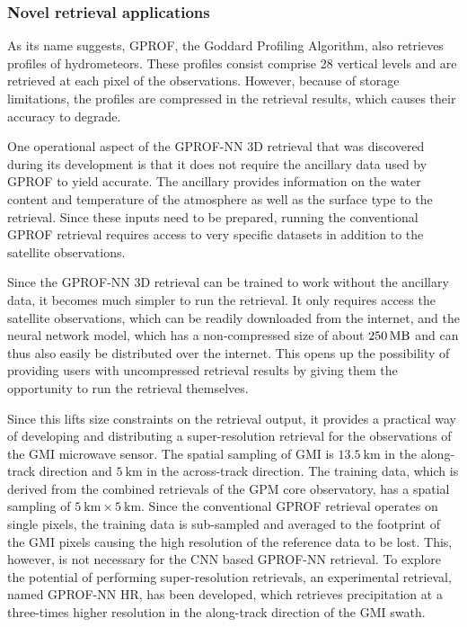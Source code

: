 \subsubsection{Novel retrieval applications}

As its name suggests, GPROF, the Goddard Profiling Algorithm, also retrieves
profiles of hydrometeors. These profiles consist comprise 28 vertical levels and
are retrieved at each pixel of the observations. However, because of storage
limitations, the profiles are compressed in the retrieval results, which causes
their accuracy to degrade.

One operational aspect of the GPROF-NN 3D retrieval that was discovered during
its development is that it does not require the ancillary data used by GPROF to
yield accurate. The ancillary provides information on the water content and
temperature of the atmosphere as well as the surface type to the retrieval.
Since these inputs need to be prepared, running the conventional GPROF retrieval
requires access to very specific datasets in addition to the satellite
observations.


Since the GPROF-NN 3D retrieval can be trained to work without the ancillary
data, it becomes much simpler to run the retrieval. It only requires access the
satellite observations, which can be readily downloaded from the internet, and
the neural network model, which has a non-compressed size of about
$\SI{250}{\mega \byte}$ and can thus also easily be distributed over the
internet. This opens up the possibility of providing users with uncompressed
retrieval results by giving them the opportunity to run the retrieval
themselves.

Since this lifts size constraints on the retrieval output, it provides a
practical way of developing and distributing a super-resolution retrieval for
the observations of the GMI microwave sensor. The spatial sampling of GMI is
$\SI{13.5}{\kilo \meter}$ in the along-track direction and $\SI{5}{\kilo
  \meter}$ in the across-track direction. The training data, which is derived
from the combined retrievals of the GPM core observatory, has a spatial sampling
of $\SI{5}{\kilo \meter} \times \SI{5}{\kilo \meter}$. Since the conventional
GPROF retrieval operates on single pixels, the training data is sub-sampled and
averaged to the footprint of the GMI pixels causing the high resolution of the
reference data to be lost. This, however, is not necessary for the CNN based
GPROF-NN retrieval. To explore the potential of performing super-resolution
retrievals, an experimental retrieval, named GPROF-NN HR, has been developed,
which retrieves precipitation at a three-times higher resolution in the
along-track direction of the GMI swath.


